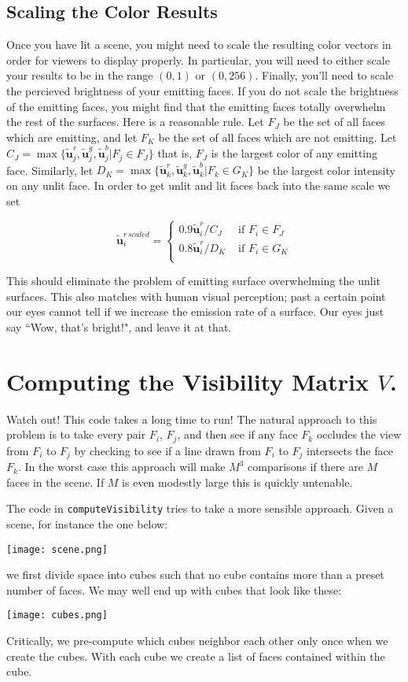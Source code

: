 \documentclass{article}
\renewcommand{\v}[1]{\mathbf{#1}}
\newcommand{\tu}{\tilde{u}}
\begin{document}
\subsection*{Scaling the Color Results}
Once you have lit a scene, you might need to scale the resulting color vectors in order for viewers to display properly.  In particular, you will need to either scale your results to be in the range $(0,1)$ or $(0,256)$.  Finally, you'll need to scale the percieved brightness of your emitting faces.  If you do not scale the brightness of the emitting faces, you might find that the emitting faces totally overwhelm the rest of the surfaces.  Here is a reasonable rule.  Let $F_J$ be the set of all faces which are emitting, and let $F_K$ be the set of all faces which are not emitting.  Let $C_J = \max \{ \v \tu^r_j, \v \tu^g_j, \v \tu^b_j | F_j \in F_J \}$ that is, $F_J$ is the largest color of any emitting face.  Similarly, let $D_K=\max\{ \v \tu^r_k, \v \tu^g_k, \v \tu^b_k | F_k \in G_K \}$ be the largest color intensity on any unlit face.  In order to get unlit and lit faces back into the same scale we set

\[\v \tu^{r\,scaled}_i = \begin{cases}
     0.9\v \tu^r_i/C_J &\text{ if } F_i \in F_J\\
     0.8\v \tu^r_i/D_K &\text{ if } F_i \in G_K\\
\end{cases}\]

This should eliminate the problem of emitting surface overwhelming the unlit surfaces.  This also matches with human visual perception; past a certain point our eyes cannot tell if we increase the emission rate of a surface.  Our eyes just say ``Wow, that's bright!", and leave it at that. 

\section*{Computing the Visibility Matrix $V$.}
Watch out!  This code takes a long time to run! The natural approach to this problem is to take every pair $F_i$, $F_j$, and then see if any face $F_k$ occludes the view from $F_i$ to $F_j$ by checking to see if a line drawn from $F_i$ to $F_j$ intersects the face $F_k$.  In the worst case this approach will make $M^3$ comparisons if there are $M$ faces in the scene.  If $M$ is even modestly large this is quickly untenable. 

The code in \texttt{computeVisibility} tries to take a more sensible approach.  Given a scene, for instance the one below:
\begin{center}
    \texttt{[image: scene.png]}
\end{center}
we first divide space into cubes such that no cube contains more than a preset number of faces. We may well end up with cubes that look like these:
\begin{center}
    \texttt{[image: cubes.png]}
\end{center}
Critically, we pre-compute which cubes neighbor each other only once when we create the cubes.  With each cube we create a list of faces contained within the cube.  
\end{document}
